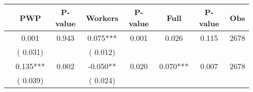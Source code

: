 
\begin{tabular}{l*{7}{c}}\hline&\multicolumn{1}{c}{PWP}&\multicolumn{1}{c}{P-value}&\multicolumn{1}{c}{Workers}&\multicolumn{1}{c}{P-value}&\multicolumn{1}{c}{Full}&\multicolumn{1}{c}{P-value}&\multicolumn{1}{c}{Obs} \\ \hline

        &              0.001       &        0.943  &              0.075***       &        0.001  &              0.026       &              0.115 &  2678 \\ 
                       &       (       0.031)             &                               &       (       0.012)                     &                               &                                               &                                &                      \\ 

        &              0.135***       &        0.002  &             -0.050**       &        0.020  &              0.070***       &              0.007 &  2678 \\ 
                       &       (       0.039)             &                               &       (       0.024)                     &                               &                                               &                                &                      \\ 

\hline \end{tabular}